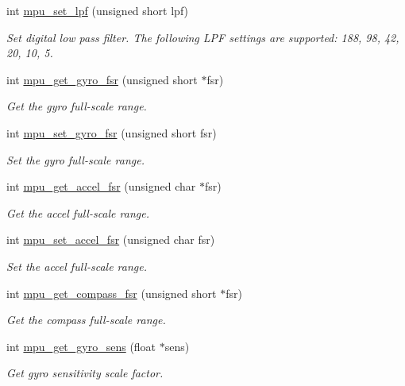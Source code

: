 \begin{DoxyCompactItemize}
int \hyperlink{group___d_r_i_v_e_r_s_ga5661a9dee25152166769910767a2a93d}{mpu\+\_\+set\+\_\+lpf} (unsigned short lpf)
\begin{DoxyCompactList}\small\item\em Set digital low pass filter. The following L\+PF settings are supported\+: 188, 98, 42, 20, 10, 5. \end{DoxyCompactList}\item 
int \hyperlink{group___d_r_i_v_e_r_s_gaf973c32c73ba912ff512aab948fc31ca}{mpu\+\_\+get\+\_\+gyro\+\_\+fsr} (unsigned short $\ast$fsr)
\begin{DoxyCompactList}\small\item\em Get the gyro full-\/scale range. \end{DoxyCompactList}\item 
int \hyperlink{group___d_r_i_v_e_r_s_gad09e6031c8677adc0b8a39b6deea8e27}{mpu\+\_\+set\+\_\+gyro\+\_\+fsr} (unsigned short fsr)
\begin{DoxyCompactList}\small\item\em Set the gyro full-\/scale range. \end{DoxyCompactList}\item 
int \hyperlink{group___d_r_i_v_e_r_s_gab6087a15ee23db23b6aec41590329a60}{mpu\+\_\+get\+\_\+accel\+\_\+fsr} (unsigned char $\ast$fsr)
\begin{DoxyCompactList}\small\item\em Get the accel full-\/scale range. \end{DoxyCompactList}\item 
int \hyperlink{group___d_r_i_v_e_r_s_ga2713a96af104cfb2ae8e0ed4c3718119}{mpu\+\_\+set\+\_\+accel\+\_\+fsr} (unsigned char fsr)
\begin{DoxyCompactList}\small\item\em Set the accel full-\/scale range. \end{DoxyCompactList}\item 
int \hyperlink{group___d_r_i_v_e_r_s_gade8589573d09e0f14b84130428f286df}{mpu\+\_\+get\+\_\+compass\+\_\+fsr} (unsigned short $\ast$fsr)
\begin{DoxyCompactList}\small\item\em Get the compass full-\/scale range. \end{DoxyCompactList}\item 
int \hyperlink{group___d_r_i_v_e_r_s_ga023c0cc94aa8f162dc33b15048a49421}{mpu\+\_\+get\+\_\+gyro\+\_\+sens} (float $\ast$sens)
\begin{DoxyCompactList}\small\item\em Get gyro sensitivity scale factor. \end{DoxyCompactList}\item 

\end{DoxyCompactItemize}

